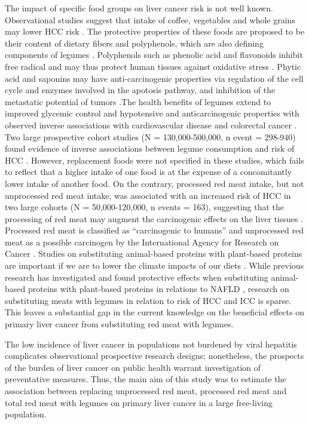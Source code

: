 \documentclass[
]{article}
\begin{document}
The impact of specific food groups on liver cancer risk is not well
known. Observational studies suggest that intake of coffee, vegetables
and whole grains may lower HCC risk \autocite{zhang2013,yang2014,Liu2021,Bhurwal2020}. The protective properties of these foods are proposed to
be their content of dietary fibers and polyphenols, which are also
defining components of legumes \autocite{rebello2014}. Polyphenols such as
phenolic acid and flavonoids inhibit free radical and may thus protect
human tissues against oxidative stress \autocite{scalbert2002,bouchenak2013}.
Phytic acid and saponins may have anti-carcinogenic properties via
regulation of the cell cycle and enzymes involved in the apotosis
pathway, and inhibition of the metastatic potential of tumors
\autocite{Vucenik2006,campos-vega2010,rebello2014}.The health benefits of
legumes extend to improved glycemic control and hypotensive and
anticarcinogenic properties with observed inverse associations with
cardiovascular disease and colorectal cancer \autocite{viguiliouk2019,jin2022}. Two large prospective cohort studies (N = 130,000-500,000, n
event = 298-940) found evidence of inverse associations between legume
consumption and risk of HCC \autocite{zhang2013,Liu2021}. However, replacement
foods were not specified in these studies, which fails to reflect that a
higher intake of one food is at the expense of a concomitantly lower
intake of another food. On the contrary, processed red meat intake, but
not unprocessed red meat intake, was associated with an increased risk
of HCC in two large cohorts (N = 50,000-120,000, n events = 163),
suggesting that the processing of red meat may augment the carcinogenic
effects on the liver tissues \autocite{Ma2019}. Processed red meat is classified
as ``carcinogenic to humans'' and unprocessed red meat as a possible
carcinogen by the International Agency for Research on Cancer
\autocite{Bouvard2015}. Studies on substituting animal-based proteins with
plant-based proteins are important if we are to lower the climate
impacts of our diets \autocite{RN71}. While previous research has investigated
and found protective effects when substituting animal-based proteins
with plant-based proteins in relations to NAFLD \autocite{Zhang2023}, research
on substituting meats with legumes in relation to risk of HCC and ICC is
sparse. This leaves a substantial gap in the current knowledge on the
beneficial effects on primary liver cancer from substituting red meat
with legumes.

The low incidence of liver cancer in populations not burdened by viral
hepatitis complicates observational prospective research designs;
nonetheless, the prospects of the burden of liver cancer on public
health warrant investigation of preventative measures. Thus, the main
aim of this study was to estimate the association between replacing
unprocessed red meat, processed red meat and total red meat with legumes
on primary liver cancer in a large free-living population.
\end{document}
